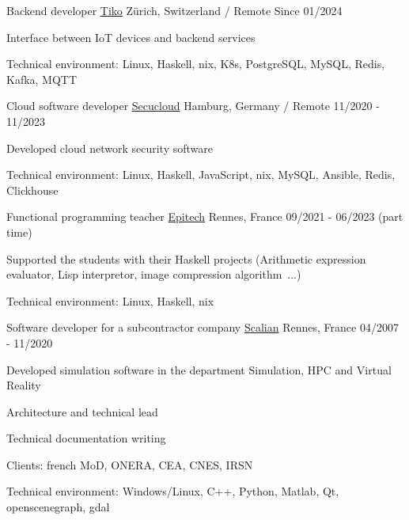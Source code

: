 \begin{cventries}
  \cventry
    {Backend developer}
    {\href{https://www.tiko.fr/}{Tiko}}
    {Zürich, Switzerland / Remote}
    {Since 01/2024}
    {
      \begin{cvitems}
        \item {Interface between IoT devices and backend services}
        \item {Technical environment: Linux, Haskell, nix, K8s, PostgreSQL, 
            MySQL, Redis, Kafka, MQTT}
      \end{cvitems}
    }

  \cventry
    {Cloud software developer}
    {\href{https://www.linkedin.com/company/secucloud/}{Secucloud}}
    {Hamburg, Germany / Remote}
    {11/2020 - 11/2023}
    {
      \begin{cvitems}
        \item {Developed cloud network security software}
        \item {Technical environment: Linux, Haskell, JavaScript, nix,
            MySQL, Ansible, Redis, Clickhouse}
      \end{cvitems}
    }

  \cventry
    {Functional programming teacher}
    {\href{https://www.epitech.eu/}{Epitech}}
    {Rennes, France}
    {09/2021 - 06/2023 (part time)}
    {
      \begin{cvitems}
          \item {Supported the students with their Haskell projects
              (Arithmetic expression evaluator, Lisp interpretor, image
              compression algorithm~...)}
          \item {Technical environment: Linux, Haskell, nix}
      \end{cvitems}
    }

  \cventry
    {Software developer for a subcontractor company}
    {\href{https://www.scalian.com/}{Scalian}}
    {Rennes, France}
    {04/2007 - 11/2020}
    {
      \begin{cvitems}
        \item {Developed simulation software in the department Simulation, HPC
            and Virtual Reality}
        \item {Architecture and technical lead}
        \item {Technical documentation writing}
        \item {Clients: french MoD, ONERA, CEA, CNES, IRSN}
        \item {Technical environment: Windows/Linux, C++, Python, Matlab, Qt,
            openscenegraph, gdal}
      \end{cvitems}
    }


\end{cventries}
